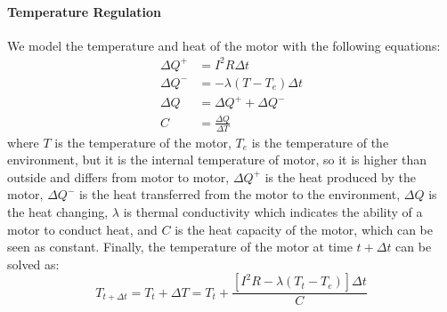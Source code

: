\documentclass{llncs}
\begin{document}
\paragraph{Temperature Regulation}
We model the temperature and heat of the motor with the following equations:
\begin{align}
  \Delta{}Q^+ &= I^2R\Delta{}t \\
  \Delta{}Q^- &= -\lambda(T-T_e)\Delta{}t \\
  \Delta{}Q &= \Delta{}Q^+ + \Delta{}Q^-\\
  C &= \frac{\Delta{}Q}{\Delta{}T}
\end{align}
where $T$ is the temperature of the motor, $T_e$
is the temperature of the environment, but it is the internal temperature
of motor, so it is higher than outside and differs from motor to
motor, $\Delta{}Q^+$ is the heat produced by the motor, $\Delta{}Q^-$ is
the heat transferred from the motor to the environment, $\Delta{}Q$ is the
heat changing, $\lambda$ is thermal conductivity which indicates the
ability of a motor to conduct heat, and $C$ is the heat capacity of
the motor, which can be seen as constant. Finally, the temperature of
the motor at time $t+\Delta{}t$ can be solved as:
\begin{equation}
  \label{eq:motor-temp}
  T_{t+\Delta{}t} = T_t + \Delta{}T = T_t + \frac{[I^2R-\lambda(T_t-T_e)]\Delta{}t}{C}
\end{equation}
\end{document}
